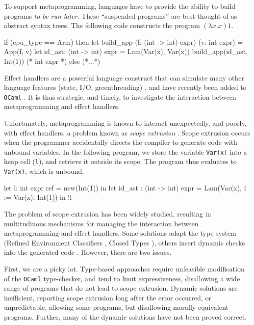 To support metaprogramming, languages have to provide the ability to build programs \textit{to be run later}. These ``suspended programs'' are best thought of as abstract syntax trees. The following code constructs the program $(\lambda x. x) 1$.
\begin{ocaml}
if (cpu_type == Arm) then 
  let build_app (f: (int -> int) expr) (v: int expr) = App(f, v)
  let id_ast: (int -> int) expr = Lam(Var(x), Var(x))
  build_app(id_ast, Int(1)) (* int expr *)
else 
  (*...*)
\end{ocaml}

Effect handlers are a powerful language construct that can simulate many other language features (state, I/O, greenthreading) \citep{pretnar-15}, and have recently been added to \texttt{OCaml} \citep{sivaramakrishnan-21}.  It is thus strategic, and timely, to investigate the interaction between metaprogramming and effect handlers. 

Unfortunately, metaprogramming is known to interact unexpectedly, and poorly, with effect handlers, a problem known as \textit{scope extrusion} \citep{kiselyov-14}. Scope extrusion occurs when the programmer accidentally directs the compiler to generate code with unbound variables. In the following program, we store the variable \texttt{Var(x)} into a heap cell (\texttt{l}), and retrieve it outside its scope. The program thus evaluates to \texttt{Var(x)}, which is unbound.

\begin{ocaml}
let l: int expr ref = new(Int(1)) in 
let id_ast : (int -> int) expr = Lam(Var(x), l := Var(x); Int(1)) in
!l
\end{ocaml} 

The problem of scope extrusion has been widely studied, resulting in multitudinous mechanisms for managing the interaction between metaprogramming and effect handlers. Some solutions adapt the type system (Refined Environment Classifiers \citep{kiselyov-16,isoda-24}, Closed Types \citep{calcagno-00}), others insert dynamic checks into the generated code \citep{kiselyov-14}. However, there are two issues.

First, we are a picky lot. Type-based approaches require unfeasible modification of the \texttt{OCaml} type-checker, and tend to limit expressiveness, disallowing a wide range of programs that do not lead to scope extrusion. Dynamic solutions are inefficient, reporting scope extrusion long after the error occurred, or unpredictable, allowing some programs, but disallowing morally equivalent programs. Further, many of the dynamic solutions have not been proved correct.

